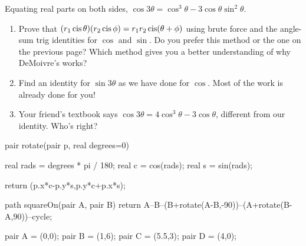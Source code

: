 \documentclass[../textbook.tex]{subfiles}
\begin{document}
\noindent Equating real parts on both sides, $\cos 3\theta = \cos^3\theta - 3\cos\theta\sin^2\theta$.

\begin{enumerate}
\setcounter{enumi}{\value{cg_problem_i}}
\item Prove that $(r_1\operatorname{cis} \theta)(r_2\operatorname{cis} \phi) = r_1r_2 \operatorname{cis}(\theta + \phi)$ using brute force and the angle-sum trig identities for $\cos$ and $\sin$. Do you prefer this method or the one on the previous page? Which method gives you a better understanding of why DeMoivre's works?
\item Find an identity for $\sin 3\theta$ as we have done for $\cos$. Most of the work is already done for you!
\item Your friend's textbook says $\cos 3\theta = 4\cos^3\theta - 3\cos \theta$, different from our identity. Who's right?

\setcounter{cg_problem_i}{\value{enumi}}
\end{enumerate}

\begin{asydef}
pair rotate(pair p, real degrees=0) {
	real rads = degrees * pi / 180;
	real c = cos(rads);
	real s = sin(rads);

	return (p.x*c-p.y*s,p.y*c+p.x*s);
}

path squareOn(pair A, pair B) {
	return A--B--(B+rotate(A-B,-90))--(A+rotate(B-A,90))--cycle;
}

pair A = (0,0);
pair B = (1,6);
pair C = (5.5,3);
pair D = (4,0);

\end{asydef}
\end{document}
